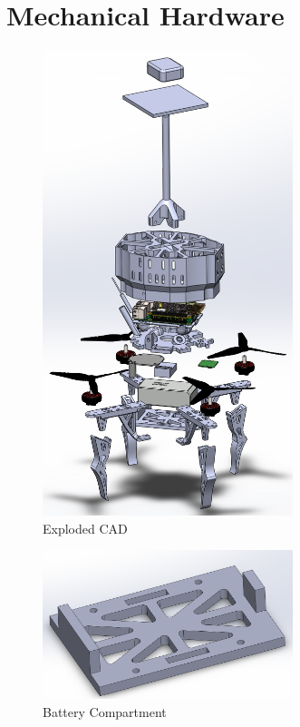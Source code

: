 \documentclass[12pt, titlepage]{article}
\begin{document}
\newpage{}

\appendix

\section{Mechanical Hardware}
\label{sec:mechHardwareAppendix}

\begin{figure}[h!]
  \begin{center} 
  \caption{Exploded CAD}
  \label{ExplodedCAD}
        \includegraphics[width=0.65\textwidth]{CAD_Exploded.png}
  \end{center}
\end{figure}

\begin{figure}[h!]
  \begin{center} 
  \caption{Battery Compartment}
  \label{Battery Compartment}
        \includegraphics[width=0.65\textwidth]{CAD_BottomPlate.png}
  \end{center}
\end{figure}
\end{document}
